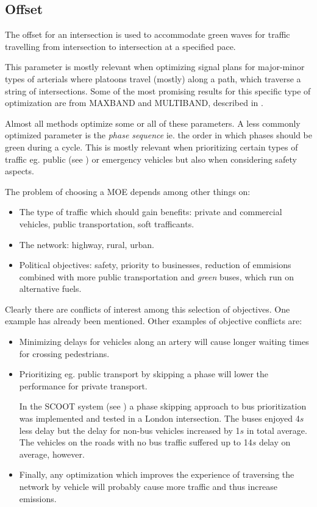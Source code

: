 \subsection*{Offset}
The offset for an intersection is used to accommodate green waves for traffic travelling from intersection to intersection at a specified pace.

This parameter is mostly relevant when optimizing signal plans for major-minor types of arterials where platoons travel (mostly) along a path, which traverse a string of intersections. Some of the most promising results for this specific type of optimization are from MAXBAND and MULTIBAND, described in \cite{37}.

Almost all methods optimize some or all of these parameters. A less commonly optimized parameter is the \textit{phase sequence} ie. the order in which phases should be green during a cycle. This is mostly relevant when prioritizing certain types of traffic eg. public (see \cite{scoot2004}) or emergency vehicles but also when considering safety aspects.

The problem of choosing a MOE depends among other things on:

\begin{itemize}
\item The type of traffic which should gain benefits: private and commercial vehicles, public transportation, soft trafficants.
\item The network: highway, rural, urban.
\item Political objectives: safety, priority to businesses, reduction of emmisions combined with more public transportation and \textit{green} buses, which run on alternative fuels.
\end{itemize}

Clearly there are conflicts of interest among this selection of objectives. One example has already been mentioned. Other examples of objective conflicts are:

\begin{itemize}
\item Minimizing delays for vehicles along an artery will cause longer waiting times for crossing pedestrians.
\item Prioritizing eg. public transport by skipping a phase will lower the performance for private transport. 

In the SCOOT system (see \cite{scoot2004}) a phase skipping approach to bus prioritization was implemented and tested in a London intersection. The buses enjoyed 4$s$ less delay but the delay for non-bus vehicles increased by 1$s$ in total average. The vehicles on the roads with no bus traffic suffered up to 14$s$ delay on average, however.
\item Finally, any optimization which improves the experience of traversing the network by vehicle will probably cause more traffic and thus increase emissions.
\end{itemize}

